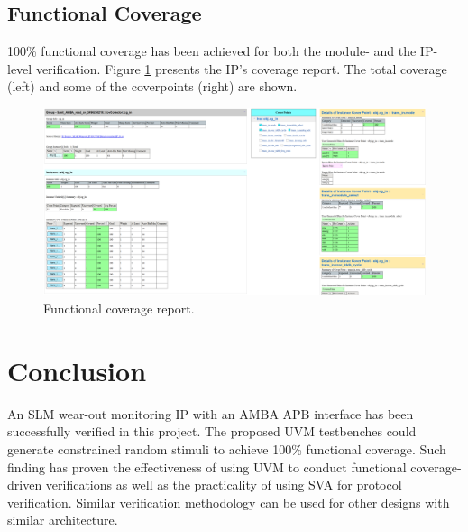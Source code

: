 \documentclass[conference]{IEEEtran}
\begin{document}
\subsection{Functional Coverage}
100\% functional coverage has been achieved for both the module- and the IP-level verification. Figure \ref{fig:coverage} presents the IP's coverage report. The total coverage (left) and some of the coverpoints (right) are shown.
\begin{figure}[h!]
    \centering
    \includegraphics[width = \textwidth]{figures/coverage.png}
    \caption{Functional coverage report.}
    \label{fig:coverage}
\end{figure}

\section{Conclusion}
An SLM wear-out monitoring IP with an AMBA APB interface has been successfully verified in this project. The proposed UVM testbenches could generate constrained random stimuli to achieve 100\% functional coverage. Such finding has proven the effectiveness of using UVM to conduct functional coverage-driven verifications as well as the practicality of using SVA for protocol verification. Similar verification methodology can be used for other designs with similar architecture.



\end{document}
